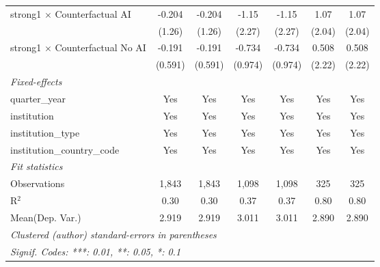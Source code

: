 \begin{tabular}{lcccccc}
   strong1 $\times$ Counterfactual AI     & -0.204  & -0.204  & -1.15   & -1.15   & 1.07   & 1.07\\   
                                          & (1.26)  & (1.26)  & (2.27)  & (2.27)  & (2.04) & (2.04)\\   
   strong1 $\times$ Counterfactual No AI  & -0.191  & -0.191  & -0.734  & -0.734  & 0.508  & 0.508\\   
                                          & (0.591) & (0.591) & (0.974) & (0.974) & (2.22) & (2.22)\\   
   \midrule
   \emph{Fixed-effects}\\
   quarter\_year                          & Yes     & Yes     & Yes     & Yes     & Yes    & Yes\\  
   institution                            & Yes     & Yes     & Yes     & Yes     & Yes    & Yes\\  
   institution\_type                      & Yes     & Yes     & Yes     & Yes     & Yes    & Yes\\  
   institution\_country\_code             & Yes     & Yes     & Yes     & Yes     & Yes    & Yes\\  
   \midrule
   \emph{Fit statistics}\\
   Observations                           & 1,843   & 1,843   & 1,098   & 1,098   & 325    & 325\\  
   R$^2$                                  & 0.30    & 0.30    & 0.37    & 0.37    & 0.80   & 0.80\\  
Mean(Dep. Var.) & 2.919 & 2.919 & 3.011 & 3.011 & 2.890 & 2.890 \\
   \midrule \midrule
   \multicolumn{7}{l}{\emph{Clustered (author) standard-errors in parentheses}}\\
   \multicolumn{7}{l}{\emph{Signif. Codes: ***: 0.01, **: 0.05, *: 0.1}}\\
\end{tabular}
\par\endgroup
